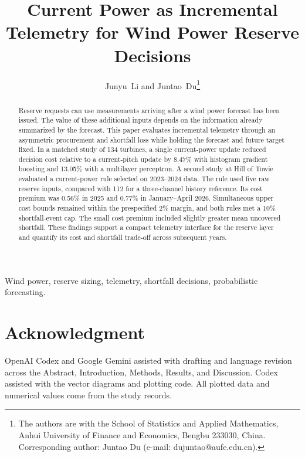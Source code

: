 \documentclass[journal]{IEEEtran}
\begin{document}
\title{Current Power as Incremental Telemetry for Wind Power Reserve Decisions}
\author{Junyu~Li and Juntao~Du\thanks{The authors are with the School of Statistics and Applied Mathematics, Anhui University of Finance and Economics, Bengbu 233030, China. Corresponding author: Juntao Du (e-mail: dujuntao@aufe.edu.cn).}}
\maketitle
\begin{abstract}
Reserve requests can use measurements arriving after a wind power forecast has been issued. The value of these additional inputs depends on the information already summarized by the forecast. This paper evaluates incremental telemetry through an asymmetric procurement and shortfall loss while holding the forecast and future target fixed. In a matched study of 134 turbines, a single current-power update reduced decision cost relative to a current-pitch update by 8.47\% with histogram gradient boosting and 13.05\% with a multilayer perceptron. A second study at Hill of Towie evaluated a current-power rule selected on 2023--2024 data. The rule used five raw reserve inputs, compared with 112 for a three-channel history reference. Its cost premium was 0.56\% in 2025 and 0.77\% in January--April 2026. Simultaneous upper cost bounds remained within the prespecified 2\% margin, and both rules met a 10\% shortfall-event cap. The small cost premium included slightly greater mean uncovered shortfall. These findings support a compact telemetry interface for the reserve layer and quantify its cost and shortfall trade-off across subsequent years.
\end{abstract}
\begin{IEEEkeywords}
Wind power, reserve sizing, telemetry, shortfall decisions, probabilistic forecasting.
\end{IEEEkeywords}






\section*{Acknowledgment}
OpenAI Codex and Google Gemini assisted with drafting and language revision across the Abstract, Introduction, Methods, Results, and Discussion. Codex assisted with the vector diagrams and plotting code. All plotted data and numerical values come from the study records.


\end{document}
